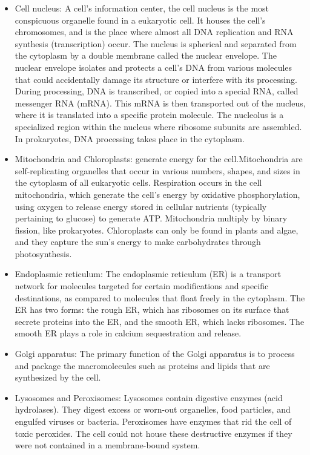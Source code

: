\begin{itemize}
\tightlist
\item
  Cell nucleus: A cell's information center, the cell nucleus is the most conspicuous organelle found in a eukaryotic cell. It houses the cell's chromosomes, and is the place where almost all DNA replication and RNA synthesis (transcription) occur. The nucleus is spherical and separated from the cytoplasm by a double membrane called the nuclear envelope. The nuclear envelope isolates and protects a cell's DNA from various molecules that could accidentally damage its structure or interfere with its processing. During processing, DNA is transcribed, or copied into a special RNA, called messenger RNA (mRNA). This mRNA is then transported out of the nucleus, where it is translated into a specific protein molecule. The nucleolus is a specialized region within the nucleus where ribosome subunits are assembled. In prokaryotes, DNA processing takes place in the cytoplasm.
\item
  Mitochondria and Chloroplasts: generate energy for the cell.Mitochondria are self-replicating organelles that occur in various numbers, shapes, and sizes in the cytoplasm of all eukaryotic cells. Respiration occurs in the cell mitochondria, which generate the cell's energy by oxidative phosphorylation, using oxygen to release energy stored in cellular nutrients (typically pertaining to glucose) to generate ATP. Mitochondria multiply by binary fission, like prokaryotes. Chloroplasts can only be found in plants and algae, and they capture the sun's energy to make carbohydrates through photosynthesis.
\item
  Endoplasmic reticulum: The endoplasmic reticulum (ER) is a transport network for molecules targeted for certain modifications and specific destinations, as compared to molecules that float freely in the cytoplasm. The ER has two forms: the rough ER, which has ribosomes on its surface that secrete proteins into the ER, and the smooth ER, which lacks ribosomes. The smooth ER plays a role in calcium sequestration and release.
\item
  Golgi apparatus: The primary function of the Golgi apparatus is to process and package the macromolecules such as proteins and lipids that are synthesized by the cell.
\item
  Lysosomes and Peroxisomes: Lysosomes contain digestive enzymes (acid hydrolases). They digest excess or worn-out organelles, food particles, and engulfed viruses or bacteria. Peroxisomes have enzymes that rid the cell of toxic peroxides. The cell could not house these destructive enzymes if they were not contained in a membrane-bound system.

\end{itemize}
